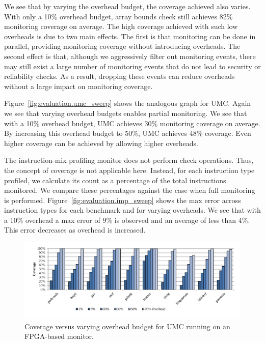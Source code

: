 We see that by varying the overhead budget, the coverage achieved also varies.
With only a 10\% overhead budget, array bounds check still
achieves 82\% monitoring coverage on average. The high coverage
achieved with such low overheads is due to two main effects.  The first is that
monitoring can be done in parallel, providing monitoring coverage without
introducing overheads. The second effect is that, although we aggressively
filter out monitoring events, there may still exist a large number of
monitoring events that do not lead to security or reliability checks. As a
result, dropping these events can reduce overheads without a large impact on
monitoring coverage.

Figure~\ref{fig:evaluation.umc_sweep} shows the analogous graph for UMC. Again
we see that varying overhead budgets enables partial monitoring. We see that
with a 10\% overhead budget, UMC achieves 30\% monitoring coverage on average.
By increasing this overhead budget to 50\%, UMC achieves 48\% coverage. Even
higher coverage can be achieved by allowing higher overheads.

The instruction-mix profiling monitor does not perform check operations. Thus,
the concept of coverage is not applicable here. Instead, for each instruction
type profiled, we calculate its count as a percentage of the total instructions
monitored. We compare these percentages against the case when full monitoring
is performed. Figure~\ref{fig:evaluation.imp_sweep} shows the max error across
instruction types for each benchmark and for varying overheads. We see that
with a 10\% overhead a max error of 9\% is observed and an average of less than
4\%. This error decreases as overhead is increased.

\begin{figure}
  \begin{center}
    \includegraphics[width=\linewidth]{figs/data_fpga_umc_sweep.pdf}
    \vspace{-0.2in}
    \caption{Coverage versus varying overhead budget for UMC running on an FPGA-based monitor.}
    \label{fig:evaluation.fpga_umc_sweep}
    \vspace{-0.1in}
  \end{center}
\end{figure}

